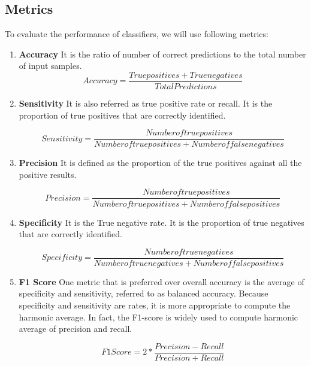 \documentclass[]{article}
\begin{document}
\subsection{Metrics}
\label{sec:metrics}

To evaluate the performance of classifiers, we will use following
metrics:

\begin{enumerate}
\item \textbf{Accuracy}
It is the ratio of number of correct predictions to the total number of input samples.
\begin{equation}
Accuracy = \frac{True positives + True negatives} {Total Predictions}
\end{equation}

\item \textbf{Sensitivity}
It is also referred as true positive rate or recall. It is the proportion of true positives that are correctly identified.

\begin{equation}
Sensitivity = \frac{Number of true positives} {Number of true positives + Number of false negatives}
\end{equation}

\item \textbf{Precision}
It is defined as the proportion of the true positives against all the positive
results.

\begin{equation}
Precision = \frac{Number of true positives} {Number of true positives + Number of false positives}
\end{equation}

\item \textbf{Specificity}
It is the True negative rate. It is the proportion of true negatives that are
correctly identified.

\begin{equation}
Specificity = \frac{Number of true negatives} {Number of true negatives + Number of false positives}
\end{equation}

\item \textbf{F1 Score}
One metric that is preferred over overall accuracy is the average of specificity and sensitivity, referred to as balanced accuracy. Because specificity and sensitivity are rates, it is more appropriate to compute the harmonic average. In fact, the F1-score is widely used to compute harmonic average of precision and recall.

\begin{equation}
F1 Score = 2 * \frac{Precision - Recall} {Precision + Recall}
\end{equation}

\end{enumerate}
\end{document}
